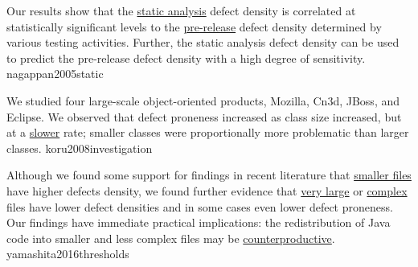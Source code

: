 \documentclass{article}
\begin{document}
  {Our results show that the \ul{static analysis} defect density is correlated at statistically significant levels to the \ul{pre-release} defect density determined by various testing activities. Further, the static analysis defect density can be used to predict the pre-release defect density with a high degree of sensitivity.}
  {nagappan2005static}

  {We studied four large-scale object-oriented products, Mozilla, Cn3d, JBoss, and Eclipse. We observed that defect proneness increased as class size increased, but at a \ul{slower} rate; smaller classes were proportionally more problematic than larger classes.}
  {koru2008investigation}

  {Although we found some support for findings in recent literature that \ul{smaller files} have higher defects density, we found further evidence that \ul{very large} or \ul{complex} files have lower defect densities and in some cases even lower defect proneness. Our findings have immediate practical implications: the redistribution of Java code into smaller and less complex files may be \ul{counterproductive}.}
  {yamashita2016thresholds}
\end{document}
